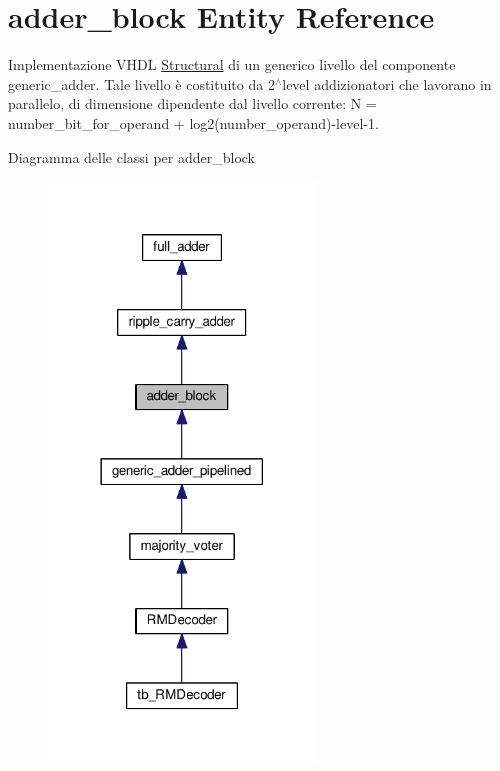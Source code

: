 \hypertarget{classadder__block}{\section{adder\+\_\+block Entity Reference}
\label{classadder__block}
}


Implementazione V\+H\+D\+L \hyperlink{classadder__block_1_1_structural}{Structural} di un generico livello del componente generic\+\_\+adder. Tale livello è costituito da 2$^\wedge$level addizionatori che lavorano in parallelo, di dimensione dipendente dal livello corrente\+: N = number\+\_\+bit\+\_\+for\+\_\+operand + log2(number\+\_\+operand)-\/level-\/1.  




Diagramma delle classi per adder\+\_\+block\nopagebreak
\begin{figure}[H]
\begin{center}
\leavevmode
\includegraphics[width=201pt]{classadder__block__inherit__graph}
\end{center}
\end{figure}



